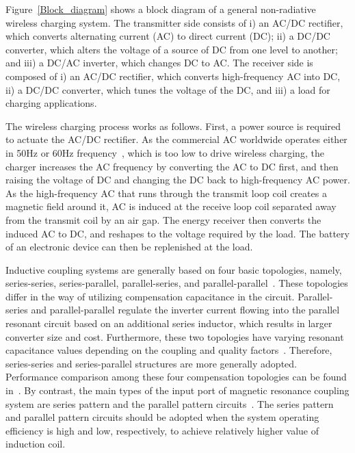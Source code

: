 \documentclass[twocolumn,10pt]{IEEEtran}
\begin{document}
Figure~\ref{Block_diagram} shows a block diagram of a general non-radiative wireless charging system. The transmitter side consists of i) an AC/DC rectifier, which converts alternating current (AC) to direct current (DC); ii) a DC/DC converter, which alters the voltage of a source of DC from one level to another; and iii) a DC/AC inverter, which changes DC to AC. The receiver side is composed of i) an AC/DC rectifier, which converts high-frequency AC into DC, ii) a DC/DC converter, which tunes the voltage of the DC, and iii) a load for charging applications.



The wireless charging process works as follows. First, a power source is required to actuate the AC/DC rectifier. As the commercial AC worldwide operates either in 50Hz or 60Hz frequency~\cite{R.2014Kurtus}, which is too low to drive wireless charging, the charger increases the AC frequency by converting the AC to DC first, and then raising the voltage of DC and changing the DC back to high-frequency AC power. As the high-frequency AC that runs through the transmit loop coil creates a magnetic field around it, AC is induced at the receive loop coil separated away from the transmit coil by an air gap. The energy receiver then converts the induced AC to DC, and reshapes to the voltage required by the load. The battery of an electronic device can then be replenished at the load.      

Inductive coupling systems are generally based on four basic topologies, namely, series-series, series-parallel, parallel-series, and parallel-parallel~\cite{J.2010Moradewicz}. These topologies differ in the way of utilizing compensation capacitance in the circuit. Parallel-series and parallel-parallel regulate the inverter current flowing into the parallel resonant circuit based on an additional series inductor, which results in larger converter size and cost. Furthermore, these two topologies have varying resonant capacitance values depending on the coupling and quality factors~\cite{J.2010Moradewicz}. Therefore, series-series and series-parallel structures are more generally adopted. Performance comparison among these four compensation topologies can be found in~\cite{N.2013Jamal}. By contrast, the main types of the input port of magnetic resonance coupling system are series pattern and the parallel pattern circuits~\cite{M.2013Yang}. The series pattern and parallel pattern circuits should be adopted when the system operating efficiency is high and low, respectively, to achieve relatively higher value of induction coil.
\end{document}
